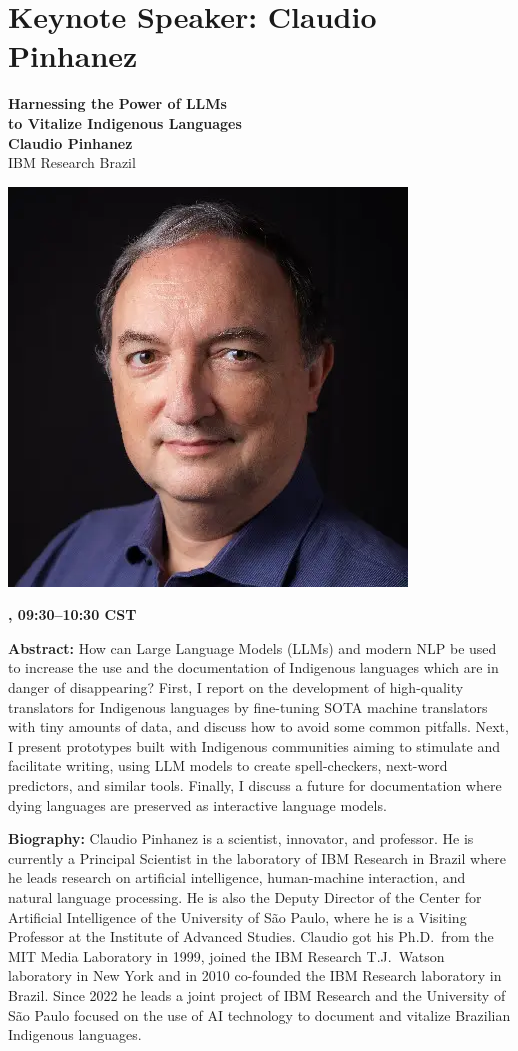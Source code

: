 \newpage
{}
\section{Keynote Speaker: Claudio Pinhanez}

\begin{center}
{\bfseries\Large Harnessing the Power of LLMs\\\vspace{2.0\lineskip}to Vitalize Indigenous Languages} \\
\vspace{1.0em}
{\large\bf Claudio Pinhanez} \\
IBM Research Brazil

\includegraphics[width=0.4\linewidth]{content/day1/claudio-headshot.png}

\textbf{\daydateyear{}, 09:30--10:30 CST}\\
\textbf{\PlenaryLoc{}}
\end{center}

\noindent
{\bfseries Abstract:} How can Large Language Models (LLMs) and modern NLP be used to increase the use and the documentation of Indigenous languages which are in danger of disappearing? First, I report on the development of high-quality translators for Indigenous languages by fine-tuning SOTA machine translators with tiny amounts of data, and discuss how to avoid some common pitfalls. Next, I present prototypes built with Indigenous communities aiming to stimulate and facilitate writing, using LLM models to create spell-checkers, next-word predictors, and similar tools. Finally, I discuss a future for documentation where dying languages are preserved as interactive language models.

\vspace{1em}

{\bfseries Biography:} 
Claudio Pinhanez is a scientist, innovator, and professor. He is currently a Principal Scientist in the laboratory of IBM Research in Brazil where he leads research on artificial intelligence, human-machine interaction, and natural language processing. He is also the Deputy Director of the Center for Artificial Intelligence of the University of S\~ao Paulo, where he is a Visiting Professor at the Institute of Advanced Studies. Claudio got his Ph.D.~from the MIT Media Laboratory in 1999, joined the IBM Research T.J.~Watson laboratory in New York and in 2010 co-founded the IBM Research laboratory in Brazil. Since 2022 he leads a joint project of IBM Research and the University of S\~ao Paulo focused on the use of AI technology to document and vitalize Brazilian Indigenous languages.

\newpage
